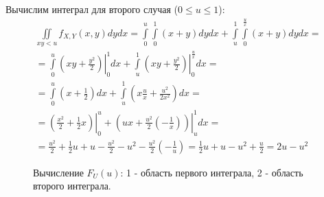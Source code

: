 \documentclass[a4paper,12pt]{article}
\begin{document}
\begin{enumerate}
        Вычислим интеграл для второго случая ($0 \le u \le 1$):
        \begin{multline}
            \iint \limits_{xy < u} f_{X,Y}(x, y) dy dx
            = \int \limits_0^u \int \limits_0^1 ( x + y ) dy dx + \int \limits_u^1 \int \limits_0^{\frac{u}{x}} ( x + y ) dy dx = \\
            = \int \limits_0^u \left . \left ( x y + \frac{y^2}{2} \right ) \right |_0^1 dx + \int \limits_u^1 \left . \left ( x y + \frac{y^2}{2} \right ) \right |_0^{\frac{u}{x}} dx = \\
            = \int \limits_0^u \left ( x + \frac{1}{2} \right ) dx + \int \limits_u^1 \left ( x \frac{u}{x} + \frac{u^2}{2x^2} \right ) dx = \\
            = \left . \left ( \frac{x^2}{2} + \frac{1}{2} x \right ) \right |_0^u + \left . \left ( u x + \frac{u^2}{2} \left ( - \frac{1}{x} \right ) \right ) \right |_u^1 dx = \\
            = \frac{u^2}{2} + \frac{1}{2} u + u - \frac{u^2}{2} - u^2 - \frac{u^2}{2} \left ( - \frac{1}{u} \right )
            = \frac{1}{2} u + u - u^2 + \frac{u}{2}
            = 2 u - u^2
        \end{multline}

        \begin{figure}[!h]
            \center
            \caption{Вычисление $F_U(u)$: 1 - область первого интеграла, 2 - область второго интеграла.}
        \end{figure}


\end{enumerate}
\end{document}
